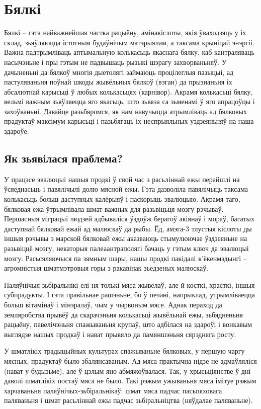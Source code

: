 \chapter{Бялкі}

Бялкі – гэта найважнейшая частка рацыёну, амінакіслоты, якія ўваходзяць у іх склад, зьяўляюцца істотным будаўнічым матэрыялам, а таксама крыніцай энэргіі. Важна падтрымліваць аптымальную колькасьць якаснага бялку, каб кантраляваць насычэньне і пры гэтым не падвышаць рызыкі шэрагу захворваньняў. У дачыненьні да бялкоў многія дыетолягі займаюць процілеглыя пазыцыі, ад пастуляваньня поўнай шкоды жывёльных бялкоў (вэган) да прызнаньня іх абсалютнай карысьці ў любых колькасьцях (карнівор). Акрамя колькасьці бялку, вельмі важным зьяўляецца яго якасьць, што зьвяза са зьменамі ў яго апрацоўцы і захоўваньні. Давайце разьбяромся, як нам навучыцца атрымліваць ад бялковых прадуктаў максімум карысьці і пазьбягаць іх неспрыяльных уздзеяньняў на наша здароўе.

\section{Як зьявілася праблема?}

У працэсе эвалюцыі нашыя продкі ў свой час з расьліннай ежы перайшлі на ўсяеднасьць і павялічылі долю мясной ежы. Гэта дазволіла павялічыць таксама колькасьць больш даступных калёрыяў і паскорыць эвалюцыю. Акрамя таго, бялковая ежа ўтрымлівала шмат важных для разьвіцьця мозгу рэчываў. Першасныя міграцыі людзей адбываліся ўздоўж берагоў акіянаў і мораў, багатых даступнай бялковай ежай ад малюскаў да рыбы. Ёд, амэга-3 тлустыя кіслоты ды іншыя рэчывы з марской бялковай ежы аказваюць стымулюючае ўздзеяньне на разьвіццё мозгу, некаторыя палеаантраполягі бачаць у гэтым ключ да эвалюцыі мозгу. Расьсяляючыся па зямным шары, нашы продкі пакідалі к'ёкенмэдынгі – агромністыя шматмэтровыя горы з ракавінак зьедзеных малюскаў.

Паляўнічыя-зьбіральнікі елі ня толькі мяса жывёлаў, але й косткі, храсткі, іншыя субпрадукты. І гэта правільнае рашэньне, бо ў печані, напрыклад, утрымліваецца больш вітамінаў і мінэралаў, чым у чырвоным мясе. Аднак пераход да земляробства прывёў да скарачэньня колькасьці жывёльнай ежы, зьбядненьня рацыёну, павелічэньня спажываньня крупаў, што адбілася на здароўі і вонкавым выглядзе нашых продкаў і нават прывяло да памяншэньня сярэдняга росту.

У шматлікіх традыцыйных культурах спажываньне бялковых, у першую чаргу мясных, прадуктаў было збалянсаваным. Ад мяса практычна нідзе не адмаўляліся (нават у будызьме), але ў цэлым яно абмяжоўвалася. Так, у хрысьціянстве ў дні даволі шматлікіх постаў мяса не было. Такі рэжым ужываньня мяса імітуе рэжым харчаваньня паляўнічых-зьбіральнікаў: шмат мяса падчас пасьпяховага паляваньня і шмат расьліннай ежы падчас зьбіральніцтва (няўдалае паляваньне).

